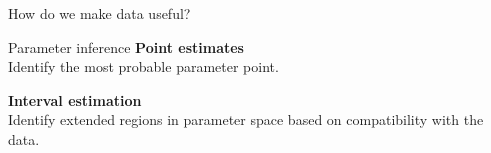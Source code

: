\documentclass[
aspectratio=169,
14pt,
professionalfonts
]{beamer}
\begin{document}




\begin{frame}
\center
\Large
How do we make data useful?
\end{frame}

\begin{frame}{Parameter inference}
    \center
    \textbf{Point estimates}\\
    Identify the most probable parameter point.

    \vspace{1cm}

    \textbf{Interval estimation}\\
    Identify extended regions in parameter space based on compatibility with the data.
\end{frame}
\end{document}
